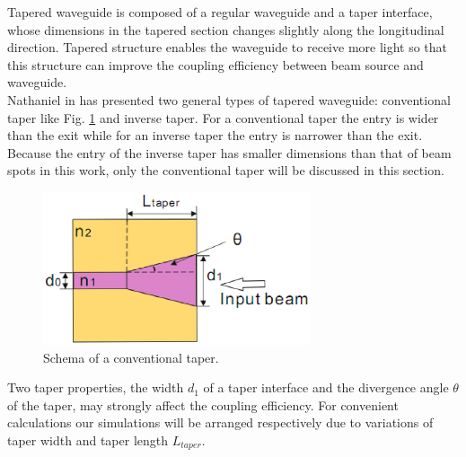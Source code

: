 Tapered waveguide is composed of a regular waveguide and a taper interface, whose dimensions in the tapered section changes slightly along the longitudinal direction\cite{linear_tapered_waveguides}. Tapered structure enables the waveguide to receive more light so that this structure can improve the coupling efficiency between beam source and waveguide.\\  

Nathaniel in \cite{design_fabrication_tapered_waveguide} has presented two general types of tapered waveguide: conventional taper like Fig. \ref{fig:conventional_taper} and inverse taper. For a conventional taper the entry is wider than the exit while for an inverse taper the entry is narrower than the exit. Because the entry of the inverse taper has smaller dimensions than that of beam spots in this work, only the conventional taper will be discussed in this section.\\

\begin{figure}[!ht]
\centering
\includegraphics[width=0.7\textwidth]{bilder/convernational_taper}
\caption{Schema of a conventional taper.}
\label{fig:conventional_taper}
\end{figure}
Two taper properties, the width $d_{1}$ of a taper interface and the divergence angle $\theta$ of the taper, may strongly affect the coupling efficiency. For convenient calculations our simulations will be arranged respectively due to variations of taper width and taper length $L_{taper}$.
